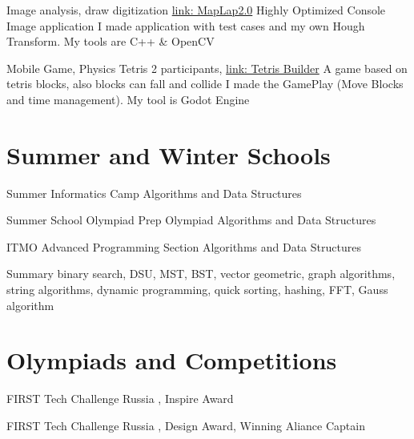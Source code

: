 \documentclass[12pt,a4paper]{moderncv}
\begin{document}
         {Image analysis, draw digitization} {\textcolor{blue} {\href{https://github.com/a-alex-l/MapLap_2} {link: MapLap2.0}}} {\newline Highly Optimized Console Image application}{} {I made application with test cases and my own Hough Transform. My tools are \textcolor{Attention} {C++ \& OpenCV} }
        
         {Mobile Game, Physics Tetris} {2 participants, \textcolor{blue} {\href{https://github.com/a-alex-l/TetrisBuilder} {link: Tetris Builder}}} {\newline A game based on tetris blocks, also blocks can fall and collide}{} {I made the GamePlay (Move Blocks and time management). My tool is \textcolor{Attention} {Godot Engine} }
        
    \section{Summer and Winter Schools}
        
         {Summer Informatics Camp} {}{} {Algorithms and Data Structures} {}
        
         {Summer School Olympiad Prep} {}{} {Olympiad Algorithms and Data Structures} {}
        
         {ITMO Advanced Programming Section} {}{} {Algorithms and Data Structures} {}
        
        \cventry{} {Summary} {}{} { binary search, DSU, MST, BST, vector geometric, graph algorithms, string algorithms, dynamic programming, quick sorting, hashing, FFT, Gauss algorithm} {}
    
    \section{Olympiads and Competitions}
    
         {FIRST Tech Challenge Russia} {}{} {\textcolor{blue} {}, \textcolor{Attention} {Inspire Award}} {}
        
         {FIRST Tech Challenge Russia} {}{} {\textcolor{blue} {}, \textcolor{Attention} {Design Award}, \textcolor{Attention} {Winning Aliance Captain}} {}
        
\end{document}
